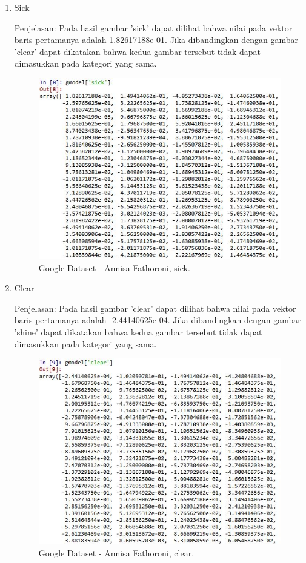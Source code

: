 \begin{enumerate}
\begin{enumerate}
\item Sick

Penjelasan: Pada hasil gambar 'sick' dapat dilihat bahwa nilai pada vektor baris pertamanya adalah 1.82617188e-01. Jika dibandingkan dengan gambar 'clear' dapat dikatakan bahwa kedua gambar tersebut tidak dapat dimasukkan pada kategori yang sama.

\begin{figure}[!hbtp]
\centering
\includegraphics[scale=0.7]{figures/Chapter5AnnisaFathoroni15sick.jpg}
\caption{Google Dataset - Annisa Fathoroni, sick.}
\label{Google Dataset - Annisa Fathoroni, sick.}
\end{figure}

\item Clear

Penjelasan: Pada hasil gambar 'clear' dapat dilihat bahwa nilai pada vektor baris pertamanya adalah -2.44140625e-04. Jika dibandingkan dengan gambar 'shine' dapat dikatakan bahwa kedua gambar tersebut tidak dapat dimasukkan pada kategori yang sama.

\begin{figure}[!hbtp]
\centering
\includegraphics[scale=0.7]{figures/Chapter5AnnisaFathoroni16clear.jpg}
\caption{Google Dataset - Annisa Fathoroni, clear.}
\label{Google Dataset - Annisa Fathoroni, clear.}
\end{figure}


\end{enumerate}
\end{enumerate}
